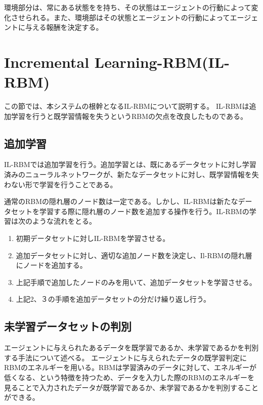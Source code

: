 環境部分は、常にある状態をを持ち、その状態はエージェントの行動によって変化させられる。また、環境部はその状態とエージェントの行動によってエージェントに与える報酬を決定する。

\section{Incremental Learning-RBM(IL-RBM)}

この節では、本システムの根幹となるIL-RBMについて説明する。
IL-RBMは追加学習を行うと既学習情報を失うというRBMの欠点を改良したものである。

\subsection{追加学習}
IL-RBMでは追加学習を行う。追加学習とは、既にあるデータセットに対し学習済みのニューラルネットワークが、新たなデータセットに対し、既学習情報を失わない形で学習を行うことである。

通常のRBMの隠れ層のノード数は一定である。しかし、IL-RBMは新たなデータセットを学習する際に隠れ層のノード数を追加する操作を行う。IL-RBMの学習は次のような流れをとる。

\begin{enumerate}
  \item 初期データセットに対しIL-RBMを学習させる。
  \item 追加データセットに対し、適切な追加ノード数を決定し、Il-RBMの隠れ層にノードを追加する。
  \item 上記手順で追加したノードのみを用いて、追加データセットを学習させる。
  \item 上記2、３の手順を追加データセットの分だけ繰り返し行う。
\end{enumerate}





\subsection{未学習データセットの判別}
エージェントに与えられたあるデータを既学習であるか、未学習であるかを判別する手法について述べる。
エージェントに与えられたデータの既学習判定にRBMのエネルギーを用いる。RBMは学習済みのデータに対して、エネルギーが低くなる、という特徴を持つため、データを入力した際のRBMのエネルギーを見ることで入力されたデータが既学習であるか、未学習であるかを判別することができる。





